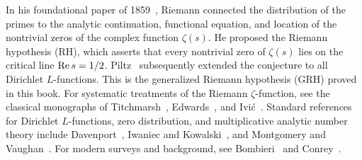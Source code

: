 In his foundational paper of 1859~\cite{Riemann1859}, Riemann connected the distribution of the primes to the analytic continuation, functional equation, and location of the nontrivial zeros of the complex function $\zeta(s)$. He proposed the Riemann hypothesis (RH), which asserts that every nontrivial zero of $\zeta(s)$ lies on the critical line $\operatorname{Re} s=1/2$. Piltz~\cite{Piltz1884} subsequently extended the conjecture to all Dirichlet $L$-functions. This is the generalized Riemann hypothesis (GRH) proved in this book. For systematic treatments of the Riemann $\zeta$-function, see the classical monographs of Titchmarsh~\cite{Titchmarsh1986}, Edwards~\cite{Edwards1974}, and Ivić~\cite{Ivic1985}. Standard references for Dirichlet $L$-functions, zero distribution, and multiplicative analytic number theory include Davenport~\cite{Davenport2000}, Iwaniec and Kowalski~\cite{IwaniecKowalski2004}, and Montgomery and Vaughan~\cite{MontgomeryVaughan2007}. For modern surveys and background, see Bombieri~\cite{Bombieri2000} and Conrey~\cite{Conrey2003}.

